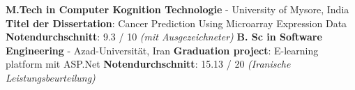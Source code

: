 %
%
%

\vspace{1em}

\begin{scholarship}
	{
		\textbf{M.Tech in Computer Kognition Technologie} - University of Mysore, India \newline
		\textbf{Titel der Dissertation}: Cancer Prediction Using Microarray Expression Data \newline
		\textbf{Notendurchschnitt}: 9.3 / 10 \textit{(mit Ausgezeichneter) }\newline
	}
	{
		\textbf{B. Sc in Software Engineering} - Azad-Universität, Iran \newline
		\textbf{Graduation project}: E-learning platform mit ASP.Net \newline
		\textbf{Notendurchschnitt}: 15.13 / 20 \textit{(Iranische Leistungsbeurteilung)}  \newline
	}
\end{scholarship}